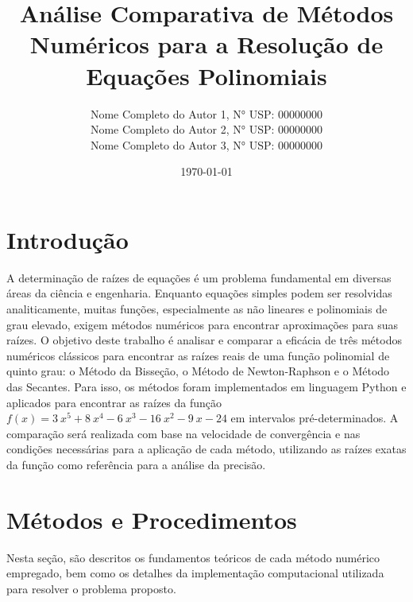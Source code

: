 \documentclass[12pt, a4paper]{article}
\title{Análise Comparativa de Métodos Numéricos para a Resolução de Equações Polinomiais}
\author{
    Nome Completo do Autor 1, N° USP: 00000000 \\
    Nome Completo do Autor 2, N° USP: 00000000 \\
    Nome Completo do Autor 3, N° USP: 00000000
}
\date{\today}
\begin{document}
\maketitle

\section*{Introdução}
A determinação de raízes de equações é um problema fundamental em diversas áreas da ciência e engenharia. Enquanto equações simples podem ser resolvidas analiticamente, muitas funções, especialmente as não lineares e polinomiais de grau elevado, exigem métodos numéricos para encontrar aproximações para suas raízes. O objetivo deste trabalho é analisar e comparar a eficácia de três métodos numéricos clássicos para encontrar as raízes reais de uma função polinomial de quinto grau: o Método da Bisseção, o Método de Newton-Raphson e o Método das Secantes. Para isso, os métodos foram implementados em linguagem Python e aplicados para encontrar as raízes da função $f(x)=3~x^{5}+8~x^{4}-6~x^{3}-16~x^{2}-9~x-24$ em intervalos pré-determinados. A comparação será realizada com base na velocidade de convergência e nas condições necessárias para a aplicação de cada método, utilizando as raízes exatas da função como referência para a análise da precisão.

\section*{Métodos e Procedimentos}
Nesta seção, são descritos os fundamentos teóricos de cada método numérico empregado, bem como os detalhes da implementação computacional utilizada para resolver o problema proposto.
\end{document}
